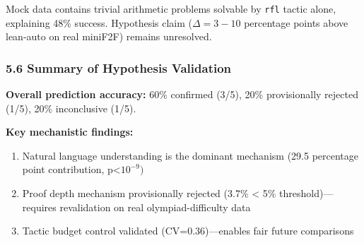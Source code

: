 Mock data contains trivial arithmetic problems solvable by \texttt{rfl} tactic alone, explaining 48\% success. Hypothesis claim ($\Delta =3-10$ percentage points above lean-auto on real miniF2F) remains unresolved.

\subsubsection{5.6 Summary of Hypothesis Validation}

\begin{table}[htbp]
\centering
{}
\end{table}

\textbf{Overall prediction accuracy:} 60\% confirmed (3/5), 20\% provisionally rejected (1/5), 20\% inconclusive (1/5).

\textbf{Key mechanistic findings:}
\begin{enumerate}
\item Natural language understanding is the dominant mechanism (29.5 percentage point contribution, p<$10^{-9})$
\item Proof depth mechanism provisionally rejected (3.7\% < 5\% threshold)---requires revalidation on real olympiad-difficulty data
\item Tactic budget control validated (CV=0.36)---enables fair future comparisons
\end{enumerate}
